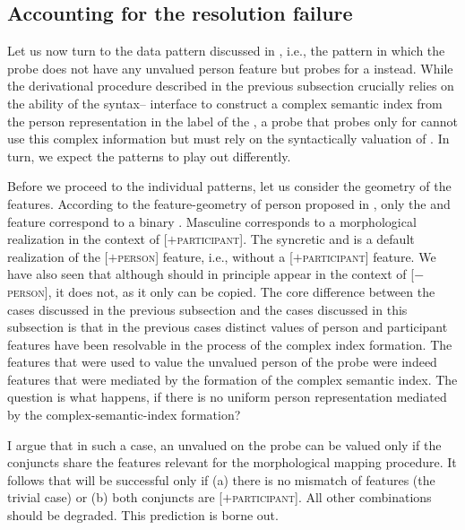 \documentclass[output=paper,modfontsnewtxmath,hidelinks]{langscibook}
\begin{document}
\subsection{Accounting for the resolution failure}

Let us now turn to the data pattern discussed in , i.e., the pattern in which the probe does not have any unvalued person feature but probes for a  instead. While the derivational procedure described in the previous subsection crucially relies on the ability of the syntax-- interface to construct a complex semantic index from the person representation in the label of the , a probe that probes only for  cannot use this complex information but must rely on the syntactically  valuation of . In turn, we expect the  patterns to play out differently. 

Before we proceed to the individual patterns, let us consider the geometry of the  features. According to the feature-geometry of person proposed in , only the   and  feature correspond to a binary . Masculine  corresponds to a morphological realization in the context of [$+$\textsc{participant}]. The syncretic   and   is a default realization of the [$+$\textsc{person}] feature, i.e., without a  [$+$\textsc{participant}] feature. We have also seen that although  should in principle appear in the context of [$-$\textsc{person}], it does not, as it only can be copied. The core difference between the cases discussed in the previous subsection and the cases discussed in this subsection is that in the previous cases distinct values of person and participant features have been resolvable in the process of the complex index formation. The features that were used to value the unvalued person of the probe were indeed features that were mediated by the formation of the complex semantic index. The question is what happens, if there is no uniform person representation mediated by the complex-semantic-index formation?

I argue that in such a case, an unvalued  on the probe can be valued only if the conjuncts share the features relevant for the morphological mapping procedure. It follows that  will be successful only if (a) there is no mismatch of  features (the trivial case) or (b) both conjuncts are [$+$\textsc{participant}]. All other combinations should be degraded. This prediction is borne out.
\end{document}
